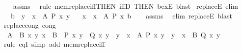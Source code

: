 \begin{isabellebody}
%
\isadelimproof
\ \ %
\endisadelimproof
%
\isatagproof
{}\isamarkupfalse%
\ assms\ \isamarkupfalse%
\ {\isacharparenleft}{\kern0pt}rule\ mem{\isacharunderscore}{\kern0pt}replace{\isacharunderscore}{\kern0pt}iff{\isacharbrackleft}{\kern0pt}THEN\ iffD{}{\isacharcomma}{\kern0pt}\ THEN\ bexE{\isacharbrackright}{\kern0pt}{\isacharparenright}{\kern0pt}\ blast%
\endisatagproof
{\isafoldproof}%
%
\isadelimproof
\isanewline
%
\endisadelimproof
\isanewline
\isanewline
{}\isamarkupfalse%
\ replaceE{\isacharprime}{\kern0pt}\ {\isacharbrackleft}{\kern0pt}elim{\isacharbang}{\kern0pt}{\isacharbrackright}{\kern0pt}{\isacharcolon}{\kern0pt}\isanewline
\ \ \ {\isachardoublequoteopen}b\ {\isasymin}\ {\isacharbraceleft}{\kern0pt}y\ {\isacharbar}{\kern0pt}\ x\ {\isasymin}\ A{\isacharcomma}{\kern0pt}\ P\ x\ y{\isacharbraceright}{\kern0pt}{\isachardoublequoteclose}\isanewline
\ \ \ x\ \ {\isachardoublequoteopen}x\ {\isasymin}\ A{\isachardoublequoteclose}\ {\isachardoublequoteopen}P\ x\ b{\isachardoublequoteclose}\isanewline
%
\isadelimproof
\ \ %
\endisadelimproof
%
\isatagproof
{}\isamarkupfalse%
\ assms\ \isamarkupfalse%
\ {\isacharparenleft}{\kern0pt}elim\ replaceE{\isacharparenright}{\kern0pt}\ blast%
\endisatagproof
{\isafoldproof}%
%
\isadelimproof
\isanewline
%
\endisadelimproof
\isanewline
{}\isamarkupfalse%
\ replace{\isacharunderscore}{\kern0pt}cong\ {\isacharbrackleft}{\kern0pt}cong{\isacharbrackright}{\kern0pt}{\isacharcolon}{\kern0pt}\isanewline
\ \ {\isachardoublequoteopen}{\isasymlbrakk}A\ {\isacharequal}{\kern0pt}\ B{\isacharsemicolon}{\kern0pt}\ {\isasymAnd}x\ y{\isachardot}{\kern0pt}\ x\ {\isasymin}\ B\ {\isasymLongrightarrow}\ P\ x\ y\ {\isasymlongleftrightarrow}\ Q\ x\ y{\isasymrbrakk}\ {\isasymLongrightarrow}\ {\isacharbraceleft}{\kern0pt}y\ {\isacharbar}{\kern0pt}\ x\ {\isasymin}\ A{\isacharcomma}{\kern0pt}\ P\ x\ y{\isacharbraceright}{\kern0pt}\ {\isacharequal}{\kern0pt}\ {\isacharbraceleft}{\kern0pt}y\ {\isacharbar}{\kern0pt}\ x\ {\isasymin}\ B{\isacharcomma}{\kern0pt}\ Q\ x\ y{\isacharbraceright}{\kern0pt}{\isachardoublequoteclose}\isanewline
%
\isadelimproof
\ \ %
\endisadelimproof
%
\isatagproof
{}\isamarkupfalse%
\ {\isacharparenleft}{\kern0pt}rule\ eqI{\isacharprime}{\kern0pt}{\isacharparenright}{\kern0pt}\ {\isacharparenleft}{\kern0pt}simp\ add{\isacharcolon}{\kern0pt}\ mem{\isacharunderscore}{\kern0pt}replace{\isacharunderscore}{\kern0pt}iff{\isacharparenright}{\kern0pt}%

\end{isabellebody}
